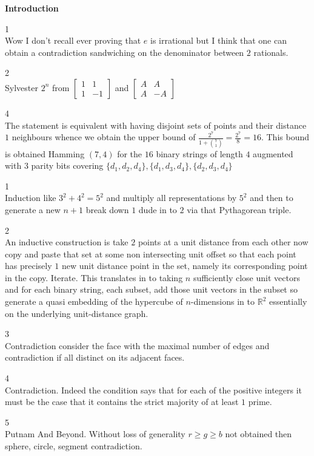 \Large

\textbf{Introduction}

1 \\
Wow I don't recall ever proving that $e$ is irrational but I think that one can obtain a contradiction sandwiching on the denominator between $2$ rationals.

2 \\
Sylvester $2^n$ from $\begin{bmatrix} 1 & 1 \\ 1 & -1 \end{bmatrix}$ and $\begin{bmatrix} A & A \\ A & -A \end{bmatrix}$

4 \\
The statement is equivalent with having disjoint sets of points and their distance $1$ neighbours whence we obtain the upper bound of $\frac{2^7}{1+\binom{7}{1}}=\frac{2^7}{8}=16$. This bound is obtained Hamming $(7,4)$ for the $16$ binary strings of length $4$ augmented with $3$ parity bits covering $\{ d_1,d_2,d_4 \}, \{ d_1,d_3,d_4 \}, \{ d_2,d_3,d_4 \}$

1 \\
Induction like $3^2+4^2=5^2$ and multiply all representations by $5^2$ and then to generate a new $n+1$ break down $1$ dude in to $2$ via that Pythagorean triple.

2 \\
An inductive construction is take $2$ points at a unit distance from each other now copy and paste that set at some non intersecting unit offset so that each point has precisely $1$ new unit distance point in the set, namely its corresponding point in the copy. Iterate. This translates in to taking $n$ sufficiently close unit vectors and for each binary string, each subset, add those unit vectors in the subset so generate a quasi embedding of the hypercube of $n$-dimensions in to $\mathbb{R}^2$ essentially on the underlying unit-distance graph.

3 \\
Contradiction consider the face with the maximal number of edges and contradiction if all distinct on its adjacent faces.

4 \\
Contradiction. Indeed the condition says that for each of the positive integers it must be the case that it contains the strict majority of at least $1$ prime.

5 \\
Putnam And Beyond. Without loss of generality $r \ge g \ge b$ not obtained then sphere, circle, segment contradiction.

